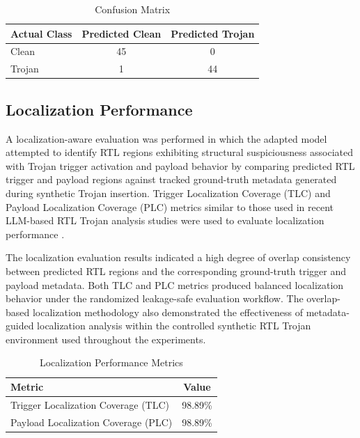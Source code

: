 \documentclass[conference]{IEEEtran}
\begin{document}
\begin{table}[!t]
\caption{Confusion Matrix}
\label{tab:confusion_matrix}
\centering
\begin{tabular}{lcc}
\toprule
Actual Class & Predicted Clean & Predicted Trojan \\
\midrule
Clean & 45 & 0 \\
Trojan & 1 & 44 \\
\bottomrule
\end{tabular}
\end{table}


\subsection{Localization Performance}
\label{subsec:localization_performance}

A localization-aware evaluation was performed in which the adapted model attempted to identify RTL regions exhibiting structural suspiciousness associated with Trojan trigger activation and payload behavior by comparing predicted RTL trigger and payload regions against tracked ground-truth metadata generated during synthetic Trojan insertion. Trigger Localization Coverage (TLC) and Payload Localization Coverage (PLC) metrics similar to those used in recent LLM-based RTL Trojan analysis studies were used to evaluate localization performance \cite{kundu2025pearl,trojanwhisper}.

The localization evaluation results indicated a high degree of overlap consistency between predicted RTL regions and the corresponding ground-truth trigger and payload metadata. Both TLC and PLC metrics produced balanced localization behavior under the randomized leakage-safe evaluation workflow. The overlap-based localization methodology also demonstrated the effectiveness of metadata-guided localization analysis within the controlled synthetic RTL Trojan environment used throughout the experiments.

\begin{table}[!t]
\caption{Localization Performance Metrics}
\label{tab:localization_metrics}
\centering
\begin{tabular}{lc}
\toprule
Metric & Value \\
\midrule
Trigger Localization Coverage (TLC) & 98.89\% \\
Payload Localization Coverage (PLC) & 98.89\% \\
\bottomrule
\end{tabular}
\end{table}
\end{document}
